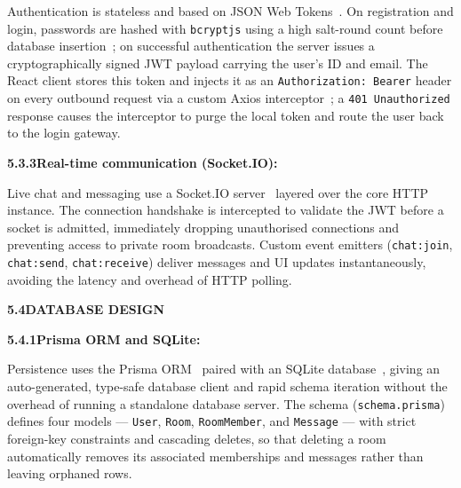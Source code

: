 \noindent Authentication is stateless and based on JSON Web Tokens~\cite{rfc7519}. On registration and login, passwords are hashed with \texttt{bcryptjs} using a high salt-round count before database insertion~\cite{bcrypt2024}; on successful authentication the server issues a cryptographically signed JWT payload carrying the user's ID and email. The React client stores this token and injects it as an \texttt{Authorization: Bearer} header on every outbound request via a custom Axios interceptor~\cite{axios2024}; a \texttt{401 Unauthorized} response causes the interceptor to purge the local token and route the user back to the login gateway.\par\vspace{0.2cm}
\clearpage
\noindent\textbf{5.3.3\quad Real-time communication (Socket.IO):}\par
{}
\vspace{0.2cm}

\noindent Live chat and messaging use a Socket.IO server~\cite{socketio2024} layered over the core HTTP instance. The connection handshake is intercepted to validate the JWT before a socket is admitted, immediately dropping unauthorised connections and preventing access to private room broadcasts. Custom event emitters (\texttt{chat:join}, \texttt{chat:send}, \texttt{chat:receive}) deliver messages and UI updates instantaneously, avoiding the latency and overhead of HTTP polling.\par\vspace{0.3cm}

\noindent\textbf{5.4\quad DATABASE DESIGN}\par
{}
\vspace{0.2cm}

\noindent\textbf{5.4.1\quad Prisma ORM and SQLite:}\par
{}
\vspace{0.2cm}

\noindent Persistence uses the Prisma ORM~\cite{prisma2024} paired with an SQLite database~\cite{sqlite2024}, giving an auto-generated, type-safe database client and rapid schema iteration without the overhead of running a standalone database server. The schema (\texttt{schema.prisma}) defines four models --- \texttt{User}, \texttt{Room}, \texttt{RoomMember}, and \texttt{Message} --- with strict foreign-key constraints and cascading deletes, so that deleting a room automatically removes its associated memberships and messages rather than leaving orphaned rows.\par\vspace{0.2cm}

